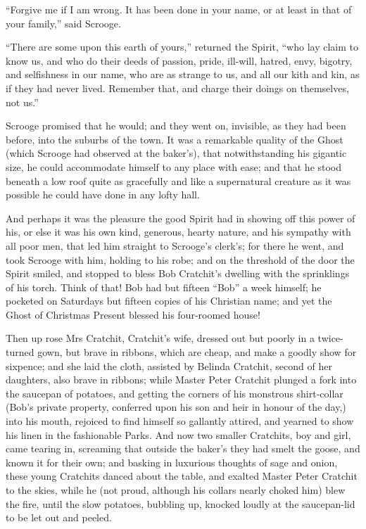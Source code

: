 \documentclass[paper=5.5in:8.5in,BCOR=10mm,twoside,DIV=15,12pt,usegeometry,openany]{scrbook} %
\begin{document}
\enquote{Forgive me if I am wrong. It has been done in your name, or at least in that of your family,} said Scrooge.

\enquote{There are some upon this earth of yours,} returned the Spirit, \enquote{who lay claim to know us, and who do their deeds of passion, pride, ill-will, hatred, envy, bigotry, and selfishness in our name, who are as strange to us, and all our kith and kin, as if they had never lived. Remember that, and charge their doings on themselves, not us.}


Scrooge promised that he would; and they went on, invisible, as they had been before, into the suburbs of the town. It was a remarkable quality of the Ghost (which Scrooge had observed at the baker's), that notwithstanding his gigantic size, he could accommodate himself to any place with ease; and that he stood beneath a low roof quite as gracefully and like a supernatural creature as it was possible he could have done in any lofty hall.



And perhaps it was the pleasure the good Spirit had in showing off this power of his, or else it was his own kind, generous, hearty nature, and his sympathy with all poor men, that led him straight to Scrooge's clerk's; for there he went, and took Scrooge with him, holding to his robe; and on the threshold of the door the Spirit smiled, and stopped to bless Bob Cratchit's dwelling with the sprinklings of his torch. Think of that! Bob had but fifteen \enquote{Bob} a week himself; he pocketed on Saturdays but fifteen copies of his Christian name; and yet the Ghost of Christmas Present blessed his four-roomed house!



Then up rose Mrs Cratchit, Cratchit's wife, dressed out but poorly in a twice-turned gown, but brave in ribbons, which are cheap, and make a goodly show for sixpence; and she laid the cloth, assisted by Belinda Cratchit, second of her daughters, also brave in ribbons; while Master Peter Cratchit plunged a fork into the saucepan of potatoes, and getting the corners of his monstrous shirt-collar (Bob's private property, conferred upon his son and heir in honour of the day,) into his mouth, rejoiced to find himself so gallantly attired, and yearned to show his linen in the fashionable Parks. And now two smaller Cratchits, boy and girl, came tearing in, screaming that outside the baker's they had smelt the goose, and known it for their own; and basking in luxurious thoughts of sage and onion, these young Cratchits danced about the table, and exalted Master Peter Cratchit to the skies, while he (not proud, although his collars nearly choked him) blew the fire, until the slow potatoes, bubbling up, knocked loudly at the saucepan-lid to be let out and peeled.
\end{document}
